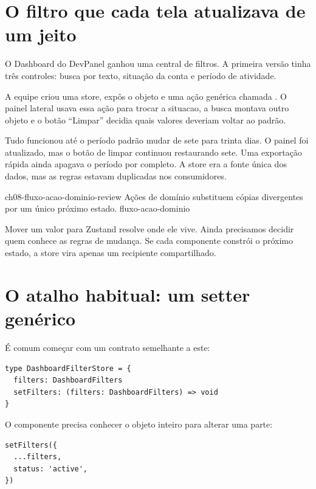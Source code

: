 \label{chap:acoes-atualizacoes}

\section{O filtro que cada tela atualizava de um jeito}

\begin{historia}
O Dashboard do DevPanel ganhou uma central de filtros. A primeira versão tinha
três controles: busca por texto, situação da conta e período de atividade.

A equipe criou uma store, expôs o objeto  e uma ação genérica
chamada . O painel lateral usava essa ação para trocar a
situacao, a busca montava outro objeto e o botão ``Limpar'' decidia quais valores
deveriam voltar ao padrão.

Tudo funcionou até o período padrão mudar de sete para trinta dias. O painel foi
atualizado, mas o botão de limpar continuou restaurando sete. Uma exportação
rápida ainda apagava o período por completo. A store era a fonte única dos
dados, mas as regras estavam duplicadas nos consumidores.
\end{historia}

\imagemcapitulo
  {ch08-fluxo-acao-dominio-review}
  {Ações de domínio substituem cópias divergentes por um único próximo estado.}
  {fluxo-acao-dominio}

Mover um valor para Zustand resolve onde ele vive. Ainda precisamos decidir
quem conhece as regras de mudança. Se cada componente constrói o próximo estado,
a store vira apenas um recipiente compartilhado.

\section{O atalho habitual: um setter genérico}

É comum começar com um contrato semelhante a este:

\begin{lstlisting}[caption={Um contrato que entrega as regras aos consumidores.}]
type DashboardFilterStore = {
  filters: DashboardFilters
  setFilters: (filters: DashboardFilters) => void
}
\end{lstlisting}

O componente precisa conhecer o objeto inteiro para alterar uma parte:

\begin{lstlisting}
setFilters({
  ...filters,
  status: 'active',
})
\end{lstlisting}

